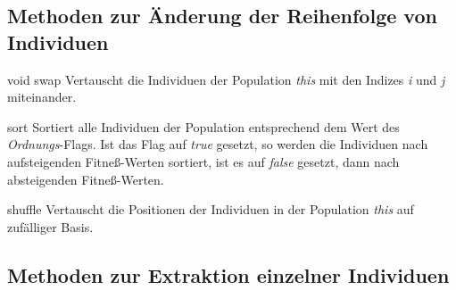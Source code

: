 \documentclass{report}
\begin{document}
\newpage

\subsection{Methoden zur \"Anderung der Reihenfolge von Individuen}

\setNormalInstance
\setCorrectWidthThree{8pt}
\printMethodWithParamsSaved
{void}
{}
{swap}
{Vertauscht die Individuen der Population {\em this} mit den Indizes {\em i} und {\em j}
    miteinander.}
{}
\setCorrectWidthThree{4pt}

\vspace{4ex}

\setNormalInstance
\printEmptyMethod
{sort}
{Sortiert alle Individuen der Population entsprechend dem Wert des
 {\em Ordnungs}-Flags. Ist das Flag auf {\em true} gesetzt, so 
 werden die Individuen nach aufsteigenden Fitne{\ss}-Werten sortiert,
 ist es auf {\em false} gesetzt, dann nach absteigenden Fitne{\ss}-Werten.}

\vspace{4ex}

\setNormalInstance
\printEmptyMethod
{shuffle}
{Vertauscht die Positionen der Individuen in der Population {\em this} auf zuf\"alliger
    Basis.}


\newpage
\subsection{Methoden zur Extraktion einzelner Individuen}
\end{document}
